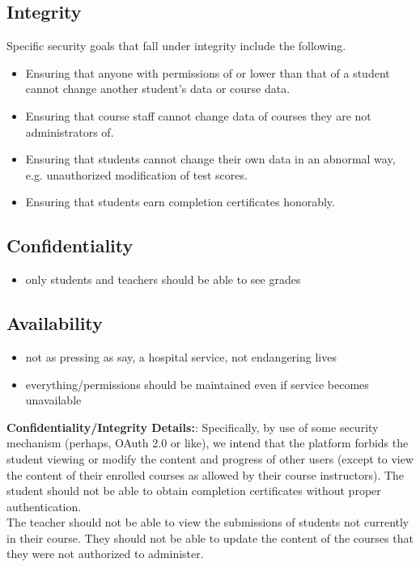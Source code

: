 \documentclass[11pt]{article}
\begin{document}
\subsection{Integrity}
Specific security goals that fall under integrity include the following.
\begin{itemize}
\item Ensuring that anyone with permissions of or lower than that of a student cannot change another student's data or course data.
\item Ensuring that course staff cannot change data of courses they are not administrators of.
\item Ensuring that students cannot change their own data in an abnormal way, e.g. unauthorized modification of test scores.
\item Ensuring that students earn completion certificates honorably.
\end{itemize}

\subsection{Confidentiality}
\begin{itemize}
\item only students and teachers should be able to see grades
\end{itemize}

\subsection{Availability}
\begin{itemize}
\item not as pressing as say, a hospital service, not endangering lives
\item everything/permissions should be maintained even if service becomes unavailable
\end{itemize}

\textbf{Confidentiality/Integrity Details:}: Specifically, by use of some security mechanism (perhaps, OAuth 2.0 or like), we intend that the platform forbids the student viewing or modify the content and progress of other users (except to view the content of their enrolled courses as allowed by their course instructors). The student should not be able to obtain completion certificates without proper authentication.\\

The teacher should not be able to view the submissions of students not currently in their course. They should not be able to update the content of the courses that they were not authorized to administer.\\
\end{document}
